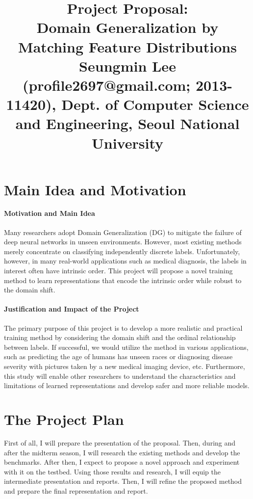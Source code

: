 \documentclass[10pt,twocolumn,letterpaper]{article}
\begin{document}
\title{Project Proposal: \\ Domain Generalization by Matching Feature Distributions \\{\rm {\normalsize Seungmin Lee (profile2697@gmail.com; 2013-11420), Dept. of Computer Science and Engineering, Seoul National University}}} 

\maketitle
\thispagestyle{empty}


\section{Main Idea and Motivation}
\paragraph{Motivation and Main Idea}  Many researchers adopt Domain Generalization (DG) to mitigate the failure of deep neural networks in unseen environments. However, most existing methods merely concentrate on classifying independently discrete labels. Unfortunately, however, in many real-world applications such as medical diagnosis, the labels in interest often have intrinsic order.
This project will propose a novel training method to learn representations that encode the intrinsic order while robust to the domain shift.

\paragraph{Justification and Impact of the Project}
The primary purpose of this project is to develop a more realistic and practical training method by considering the domain shift and the ordinal relationship between labels. If successful, we would utilize the method in various applications, such as predicting the age of humans has unseen races or diagnosing disease severity with pictures taken by a new medical imaging device, etc. Furthermore, this study will enable other researchers to understand the characteristics and limitations of learned representations and develop safer and more reliable models.


\section{The Project Plan}
First of all, I will prepare the presentation of the proposal. Then, during and after the midterm season, I will research the existing methods and develop the benchmarks. After then, I expect to propose a novel approach and experiment with it on the testbed. Using those results and research, I will equip the intermediate presentation and reports. Then, I will refine the proposed method and prepare the final representation and report.
 



{\small


}
\end{document}
